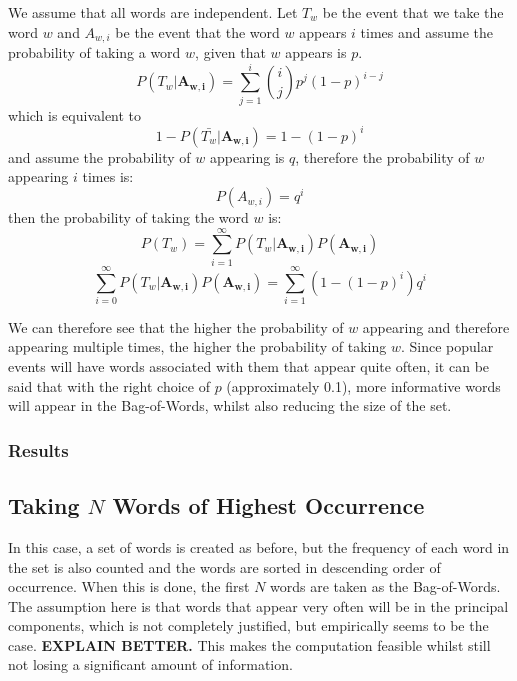 \documentclass[11pt,a4paper]{article}
\begin{document}
We assume that all words are independent. Let $T_w$ be the event that we take the word $w$ and $A_{w, i}$ be the event that the word $w$ appears $i$ times and assume the probability of taking a word $w$, given that $w$ appears is $p$. 
\begin{equation*}
P\left( T_w | \mathbf{A_{w, i}}\right) =  \sum_{j=1}^i {i \choose j} p^j\left( 1 - p\right)^{i-j}
\end{equation*}
which is equivalent to 
\begin{equation}
1 - P(\bar{T_w} |  \mathbf{A_{w, i}}) = 1 - (1 - p)^i
\end{equation}
and assume the probability of $w$ appearing is $q$, therefore the probability of $w$ appearing $i$ times is:
\begin{equation}
P\left(A_{w, i}\right) = q^i
\end{equation}
then the probability of taking the word $w$ is:
\begin{equation*}
P(T_w) = \sum_{i=1}^\infty P\left(T_w| \mathbf{A_{w, i}} \right) P( \mathbf{A_{w, i}})
\end{equation*}
\begin{equation}
\sum_{i=0}^\infty P\left(T_w| \mathbf{A_{w, i}} \right) P( \mathbf{A_{w, i}}) =\sum_{i=1}^\infty \left(1 - (1 - p)^i\right) q^i
\end{equation}

We can therefore see that the higher the probability of $w$ appearing and therefore appearing multiple times, the higher the probability of taking $w$. Since popular events will have words associated with them that appear quite often, it can be said that with the right choice of $p$ (approximately 0.1), more informative words will appear in the Bag-of-Words, whilst also reducing the size of the set. 
\subsubsection{Results}
\subsection{Taking $N$ Words of Highest Occurrence}
In this case, a set of words is created as before, but the frequency of each word in the set is also counted and the words are sorted in descending order of occurrence. When this is done, the first $N$ words are taken as the Bag-of-Words. The assumption here is that words that appear very often will be in the principal components, which is not completely justified, but empirically seems to be the case. \textbf{EXPLAIN BETTER.} This makes the computation feasible whilst still not losing a significant amount of information. 
\end{document}
